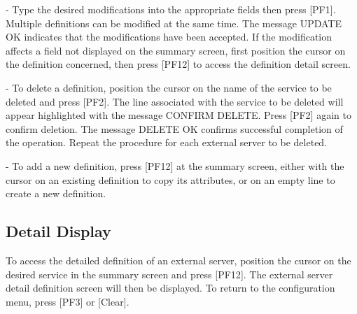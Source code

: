 \documentclass[letterpaper,10pt,english]{sphinxmanual}
\begin{document}
 - Type the desired modifications into the appropriate fields then press {[}PF1{]}. Multiple definitions can be modified at the same time. The message UPDATE OK indicates that the modifications have been accepted. If the modification affects a field not displayed on the summary screen, first position the cursor on the definition concerned, then press {[}PF12{]} to access the definition detail screen.

 - To delete a definition, position the cursor on the name of the service to be deleted and press {[}PF2{]}. The line associated with the service to be deleted will appear highlighted with the message CONFIRM DELETE. Press {[}PF2{]} again to confirm deletion. The message DELETE OK confirms successful completion of the operation. Repeat the procedure for each external server to be deleted.

 - To add a new definition, press {[}PF12{]} at the summary screen, either with the cursor on an existing definition to copy its attributes, or on an empty line to create a new definition.

\ignorespaces 

\subsection{Detail Display}
\label{\detokenize{connectivity_guide:index-133}}\label{\detokenize{connectivity_guide:id70}}
To access the detailed definition of an external server, position the cursor on the desired service in the summary screen and press {[}PF12{]}. The external server detail definition screen will then be displayed. To return to the configuration menu, press {[}PF3{]} or {[}Clear{]}.


\ignorespaces 
\end{document}
